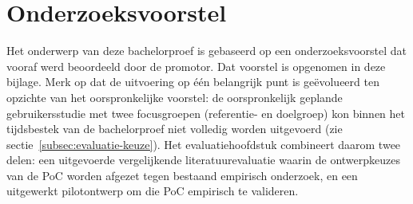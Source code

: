 \documentclass[dutch,dit,thesis]{hogentreport}
\begin{document}







\appendix

\chapter{Onderzoeksvoorstel}

Het onderwerp van deze bachelorproef is gebaseerd op een onderzoeksvoorstel dat vooraf werd beoordeeld door de promotor. Dat voorstel is opgenomen in deze bijlage.
Merk op dat de uitvoering op één belangrijk punt is geëvolueerd ten opzichte van het oorspronkelijke voorstel: de oorspronkelijk geplande gebruikersstudie met twee focusgroepen (referentie- en doelgroep) kon binnen het tijdsbestek van de bachelorproef niet volledig worden uitgevoerd (zie sectie~\ref{subsec:evaluatie-keuze}).
Het evaluatiehoofdstuk combineert daarom twee delen: een uitgevoerde vergelijkende literatuurevaluatie waarin de ontwerpkeuzes van de PoC worden afgezet tegen bestaand empirisch onderzoek, en een uitgewerkt pilotontwerp om die PoC empirisch te valideren.





\backmatter{}

\setlength\bibitemsep{2pt} %
\printbibliography[heading=bibintoc]
\end{document}
